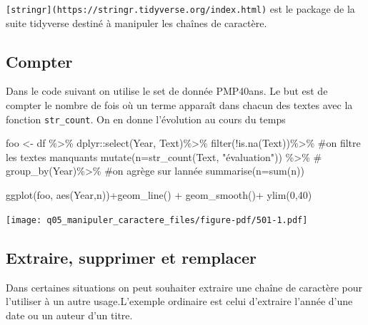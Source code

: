 \documentclass[
  letterpaper,
  DIV=11,
  numbers=noendperiod]{scrreprt}
\newenvironment{Shaded}{\begin{snugshade}}{\end{snugshade}}
\newcommand{\AttributeTok}[1]{\textcolor[rgb]{0.40,0.45,0.13}{#1}}
\newcommand{\CommentTok}[1]{\textcolor[rgb]{0.37,0.37,0.37}{#1}}
\newcommand{\DecValTok}[1]{\textcolor[rgb]{0.68,0.00,0.00}{#1}}
\newcommand{\FunctionTok}[1]{\textcolor[rgb]{0.28,0.35,0.67}{#1}}
\newcommand{\NormalTok}[1]{\textcolor[rgb]{0.00,0.23,0.31}{#1}}
\newcommand{\OtherTok}[1]{\textcolor[rgb]{0.00,0.23,0.31}{#1}}
\newcommand{\SpecialCharTok}[1]{\textcolor[rgb]{0.37,0.37,0.37}{#1}}
\newcommand{\StringTok}[1]{\textcolor[rgb]{0.13,0.47,0.30}{#1}}
\begin{document}
\texttt{{[}stringr{]}(https://stringr.tidyverse.org/index.html)} est le
package de la suite tidyverse destiné à manipuler les chaînes de
caractère.

\subsection{Compter}\label{compter}

Dans le code suivant on utilise le set de donnée PMP40ans. Le but est de
compter le nombre de fois où un terme apparaît dans chacun des textes
avec la fonction \texttt{str\_count}. On en donne l'évolution au cours
du temps

\begin{Shaded}
\begin{Highlighting}[]
\NormalTok{foo }\OtherTok{\textless{}{-}}\NormalTok{ df }\SpecialCharTok{\%\textgreater{}\%} 
\NormalTok{  dplyr}\SpecialCharTok{::}\FunctionTok{select}\NormalTok{(Year, Text)}\SpecialCharTok{\%\textgreater{}\%} 
  \FunctionTok{filter}\NormalTok{(}\SpecialCharTok{!}\FunctionTok{is.na}\NormalTok{(Text))}\SpecialCharTok{\%\textgreater{}\%} \CommentTok{\#on filtre les textes manquants}
  \FunctionTok{mutate}\NormalTok{(}\AttributeTok{n=}\FunctionTok{str\_count}\NormalTok{(Text, }\StringTok{"évaluation"}\NormalTok{)) }\SpecialCharTok{\%\textgreater{}\%} \CommentTok{\#}
  \FunctionTok{group\_by}\NormalTok{(Year)}\SpecialCharTok{\%\textgreater{}\%} \CommentTok{\#on agrège sur l\textquotesingle{}année }
  \FunctionTok{summarise}\NormalTok{(}\AttributeTok{n=}\FunctionTok{sum}\NormalTok{(n))}

\FunctionTok{ggplot}\NormalTok{(foo, }\FunctionTok{aes}\NormalTok{(Year,n))}\SpecialCharTok{+}\FunctionTok{geom\_line}\NormalTok{() }\SpecialCharTok{+}
  \FunctionTok{geom\_smooth}\NormalTok{()}\SpecialCharTok{+}
  \FunctionTok{ylim}\NormalTok{(}\DecValTok{0}\NormalTok{,}\DecValTok{40}\NormalTok{)}
\end{Highlighting}
\end{Shaded}

\texttt{[image: q05\_manipuler\_caractere\_files/figure-pdf/501-1.pdf]}

\subsection{Extraire, supprimer et
remplacer}\label{extraire-supprimer-et-remplacer}

Dans certaines situations on peut souhaiter extraire une chaîne de
caractère pour l'utiliser à un autre usage.L'exemple ordinaire est celui
d'extraire l'année d'une date ou un auteur d'un titre.
\end{document}
